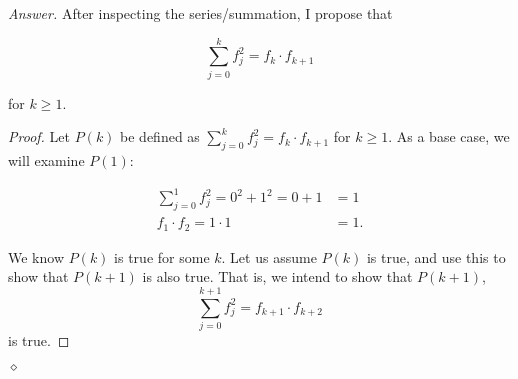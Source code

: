 \documentclass[12pt,oneside]{amsart}
\theoremstyle{remark}
\newenvironment{answer}{\bigskip\noindent\emph{Answer.}}{\hfill$\diamond$\newline}
\begin{document}
\begin{answer}
After inspecting the series/summation, I propose that

$$
\sum_{j = 0}^{k} f^2_j = f_k \cdot f_{k + 1}
$$

for $k \geq 1$.

\begin{proof}
Let $P(k)$ be defined as $\sum_{j = 0}^{k} f^2_j = f_k \cdot f_{k + 1}$ for $k \geq 1$. As a base case, we will examine $P(1)$:

\begin{align*}
\sum_{j = 0}^1 f^2_j = 0^2 + 1^2 = 0 + 1 &= 1 \\
f_1 \cdot f_{2} = 1 \cdot 1 &= 1.
\end{align*}

We know $P(k)$ is true for some $k$. Let us assume $P(k)$ is true, and use this to show that $P(k + 1)$ is also true. That is, we intend to show that $P(k + 1)$,
$$
\sum_{j = 0}^{k + 1} f^2_j = f_{k + 1} \cdot f_{k + 2}
$$ is true.
\end{proof}

\end{answer}
\end{document}
